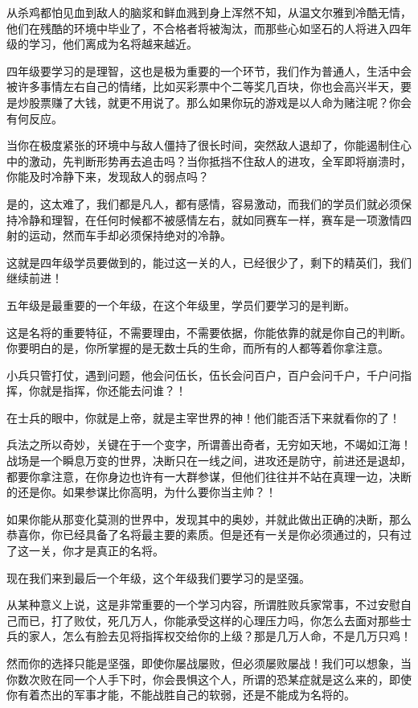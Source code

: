 \begin{multicols}{\theparacolNo}
		从杀鸡都怕见血到敌人的脑浆和鲜血溅到身上浑然不知，从温文尔雅到冷酷无情，他们在残酷的环境中毕业了，不合格者将被淘汰，而那些心如坚石的人将进入四年级的学习，他们离成为名将越来越近。

		四年级要学习的是理智，这也是极为重要的一个环节，我们作为普通人，生活中会被许多事情左右自己的情绪，比如买彩票中个二等奖几百块，你也会高兴半天，要是炒股票赚了大钱，就更不用说了。那么如果你玩的游戏是以人命为赌注呢？你会有何反应。

		当你在极度紧张的环境中与敌人僵持了很长时间，突然敌人退却了，你能遏制住心中的激动，先判断形势再去追击吗？当你抵挡不住敌人的进攻，全军即将崩溃时，你能及时冷静下来，发现敌人的弱点吗？

		是的，这太难了，我们都是凡人，都有感情，容易激动，而我们的学员们就必须保持冷静和理智，在任何时候都不被感情左右，就如同赛车一样，赛车是一项激情四射的运动，然而车手却必须保持绝对的冷静。

		这就是四年级学员要做到的，能过这一关的人，已经很少了，剩下的精英们，我们继续前进！

		五年级是最重要的一个年级，在这个年级里，学员们要学习的是判断。

		这是名将的重要特征，不需要理由，不需要依据，你能依靠的就是你自己的判断。你要明白的是，你所掌握的是无数士兵的生命，而所有的人都等着你拿注意。

		小兵只管打仗，遇到问题，他会问伍长，伍长会问百户，百户会问千户，千户问指挥，你就是指挥，你还能去问谁？！

		在士兵的眼中，你就是上帝，就是主宰世界的神！他们能否活下来就看你的了！

		兵法之所以奇妙，关键在于一个变字，所谓善出奇者，无穷如天地，不竭如江海！战场是一个瞬息万变的世界，决断只在一线之间，进攻还是防守，前进还是退却，都要你拿注意，在你身边也许有一大群参谋，但他们往往并不站在真理一边，决断的还是你。如果参谋比你高明，为什么要你当主帅？！

		如果你能从那变化莫测的世界中，发现其中的奥妙，并就此做出正确的决断，那么恭喜你，你已经具备了名将最主要的素质。但是还有一关是你必须通过的，只有过了这一关，你才是真正的名将。

		现在我们来到最后一个年级，这个年级我们要学习的是坚强。

		从某种意义上说，这是非常重要的一个学习内容，所谓胜败兵家常事，不过安慰自己而已，打了败仗，死几万人，你能承受这样的心理压力吗，你怎么去面对那些士兵的家人，怎么有脸去见将指挥权交给你的上级？那是几万人命，不是几万只鸡！

		然而你的选择只能是坚强，即使你屡战屡败，但必须屡败屡战！我们可以想象，当你数次败在同一个人手下时，你会畏惧这个人，所谓的恐某症就是这么来的，即使你有着杰出的军事才能，不能战胜自己的软弱，还是不能成为名将的。


\end{multicols}
